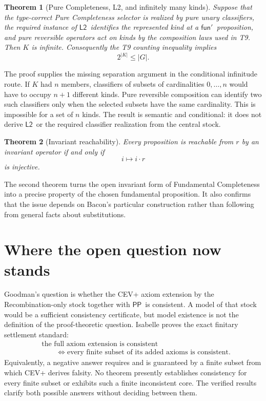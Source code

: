 \documentclass[12pt,leqno]{article}
\theoremstyle{plain}
\newtheorem{theorem}{Theorem}
\theoremstyle{definition}
\newcommand{\funp}{\ensuremath{\mathsf{fun}'\,}}
\newcommand{\PP}{\ensuremath{\mathsf{PP}}}
\newcommand{\Ltwo}{\ensuremath{\mathsf{L2}}}
\begin{document}
\begin{theorem}[Pure Completeness, L2, and infinitely many kinds]
Suppose that the type-correct Pure Completeness selector is realized by pure
unary classifiers, the required instance of \Ltwo\ identifies the represented kind at a
\(\funp\) proposition, and pure reversible operators act on kinds by the
composition laws used in T9.  Then \(K\) is infinite.  Consequently the T9
counting inequality implies
\[
 2^{|K|}\leq |G|.
\]
\end{theorem}

\noindent
The proof supplies the missing separation argument in the conditional
infinitude route.  If \(K\) had \(n\) members, classifiers of subsets of
cardinalities \(0,\ldots,n\) would have to occupy \(n+1\) different kinds.
Pure reversible composition can identify two such classifiers only when the
selected subsets have the same cardinality.  This is impossible for a set of
\(n\) kinds.  The result is semantic and conditional: it does not derive
\Ltwo\ or the required classifier realization from the central stock.

\begin{theorem}[Invariant reachability]
Every proposition is reachable from \(r\) by an invariant operator if and
only if
\[
 i\longmapsto i\cdot r
\]
is injective.
\end{theorem}

\noindent
The second theorem turns the open invariant form of Fundamental Completeness
into a precise property of the chosen fundamental proposition.  It also
confirms that the issue depends on Bacon's particular construction rather
than following from general facts about substitutions.

\section{Where the open question now stands}

Goodman's question is whether the CEV+ axiom extension by the
Recombination-only stock together with \PP\ is consistent.  A model of that
stock would be a sufficient consistency certificate, but model existence is
not the definition of the proof-theoretic question.  Isabelle proves the
exact finitary settlement standard:
\[
\begin{split}
 &\text{the full axiom extension is consistent}\\
 &\qquad\Longleftrightarrow
   \text{every finite subset of its added axioms is consistent}.
\end{split}
\]
Equivalently, a negative answer requires and is guaranteed by a finite
subset from which CEV+ derives falsity.  No theorem presently establishes
consistency for every finite subset or exhibits such a finite inconsistent
core.  The verified results clarify both possible answers without deciding
between them.
\end{document}
